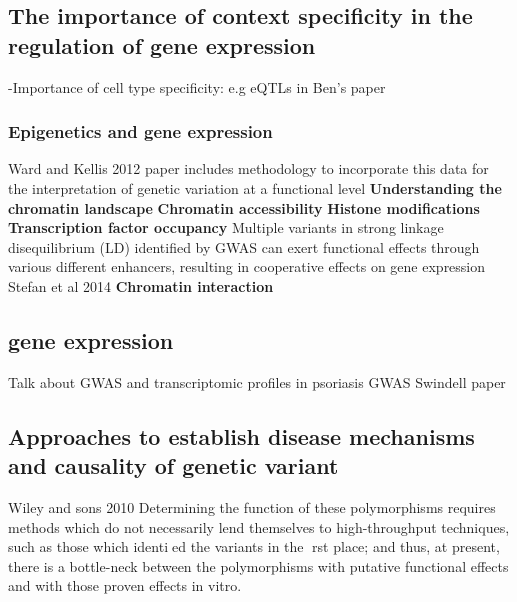 \subsection{The importance of context specificity in the regulation of gene expression}
-Importance of cell type specificity: e.g eQTLs in Ben's paper
\subsubsection*{Epigenetics and gene expression}
Ward and Kellis 2012 paper includes methodology to incorporate this data for the interpretation of genetic variation at a functional level
\textbf{Understanding the chromatin landscape}
\textbf{Chromatin accessibility}
\textbf{Histone modifications}
\textbf{Transcription factor occupancy}
Multiple   variants   in   strong   linkage   disequilibrium   (LD)
 identified by GWAS can exert functional effects through
 various different enhancers, resulting in cooperative effects
 on gene expression  Stefan et al 2014
\textbf{Chromatin interaction}

\subsection{gene expression}
Talk about GWAS and transcriptomic profiles in psoriasis GWAS Swindell paper
\subsection{Approaches to establish disease mechanisms and causality of genetic variant}
Wiley and sons 2010
Determining the function of these polymorphisms requires methods which do not   necessarily   lend   themselves   to   high-throughput techniques, such as those which identied the variants in the rst place; and thus, at present, there is a bottle-neck between the polymorphisms with putative functional effects and with those proven effects in vitro.



